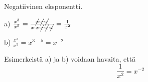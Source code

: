 \begin{esimerkki}
Negatiivinen eksponentti.

a) $\frac{x^3}{x^5}=\frac{\cancel{x}\cdot \cancel{x}\cdot \cancel{x}}{x\cdot x\cdot \cancel{x}\cdot \cancel{x}\cdot \cancel{x}}=\frac{1}{x^2}$

b) $\frac{x^3}{x^5}=x^{3-5}=x^{-2}$

Esimerkeistä a) ja b) voidaan havaita, että 
\begin{equation}
\frac{1}{x^2}=x^{-2}
\end{equation}


\end{esimerkki}


